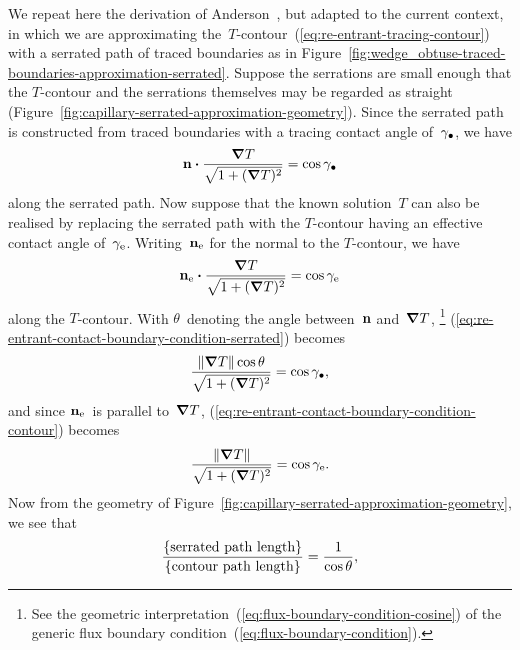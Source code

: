 We repeat here the derivation of
Anderson~\cite[Section~6.4.2]{anderson-2002-thesis-boundary-tracing-pdes},
but adapted to the current context,
in which we are approximating
the~$T$-contour~(\ref{eq:re-entrant-tracing-contour})
with a serrated path of traced boundaries
as in Figure~\ref{fig:wedge_obtuse-traced-boundaries-approximation-serrated}.
Suppose the serrations are small enough
that the $T$-contour and the serrations themselves
may be regarded as straight
(Figure~\ref{fig:capillary-serrated-approximation-geometry}).
Since the serrated path is constructed from traced boundaries
with a tracing contact angle of~$\gamma_\bullet$,
we have
\begin{equation}
  \mathop{}\!\boldsymbol{\mathbf{n}} \boldsymbol{\cdot} \frac{\mathop{}\!\boldsymbol{\mathbf{\nabla}} T}{\sqrt{1 + (\mathop{}\!\boldsymbol{\mathbf{\nabla}} T)^2}} = \cos\gamma_\bullet
  \label{eq:re-entrant-contact-boundary-condition-serrated}
\end{equation}
along the serrated path.
Now suppose that the known solution~$T$ can also be realised
by replacing the serrated path with the $T$-contour
having an effective contact angle of~$\gamma_{\mathrm{e}}$.
Writing~$\mathop{}\!\boldsymbol{\mathbf{n}}_{\mathrm{e}}$ for the normal to the $T$-contour,
we have
\begin{equation}
  \mathop{}\!\boldsymbol{\mathbf{n}}_{\mathrm{e}} \boldsymbol{\cdot} \frac{\mathop{}\!\boldsymbol{\mathbf{\nabla}} T}{\sqrt{1 + (\mathop{}\!\boldsymbol{\mathbf{\nabla}} T)^2}} = \cos\gamma_{\mathrm{e}}
  \label{eq:re-entrant-contact-boundary-condition-contour}
\end{equation}
along the $T$-contour.
With $\theta$~denoting the angle between~$\mathop{}\!\boldsymbol{\mathbf{n}}$ and~$\mathop{}\!\boldsymbol{\mathbf{\nabla}} T$,%
\footnote{
  See the geometric interpretation~(\ref{eq:flux-boundary-condition-cosine})
  of the generic flux boundary condition~(\ref{eq:flux-boundary-condition}).
}
(\ref{eq:re-entrant-contact-boundary-condition-serrated}) becomes
\begin{equation}
  \frac{\lVert\mathop{}\!\boldsymbol{\mathbf{\nabla}} T\rVert \cos\theta}{\sqrt{1 + (\mathop{}\!\boldsymbol{\mathbf{\nabla}} T)^2}} = \cos\gamma_\bullet,
  \label{eq:re-entrant-contact-boundary-condition-serrated-simplified}
\end{equation}
and since $\mathop{}\!\boldsymbol{\mathbf{n}}_{\mathrm{e}}$~is parallel to~$\mathop{}\!\boldsymbol{\mathbf{\nabla}} T$,
(\ref{eq:re-entrant-contact-boundary-condition-contour}) becomes
\begin{equation}
  \frac{\lVert\mathop{}\!\boldsymbol{\mathbf{\nabla}} T\rVert}{\sqrt{1 + (\mathop{}\!\boldsymbol{\mathbf{\nabla}} T)^2}} = \cos\gamma_{\mathrm{e}}.
  \label{eq:re-entrant-contact-boundary-condition-contour-simplified}
\end{equation}
Now from the geometry
of Figure~\ref{fig:capillary-serrated-approximation-geometry},
we see that
\begin{equation}
  \frac{\left\{\textnormal{serrated path length}\right\}}{\left\{\textnormal{contour path length}\right\}}
   = \frac{1}{\cos\theta},
   \label{eq:path-length-ratio}
\end{equation}
